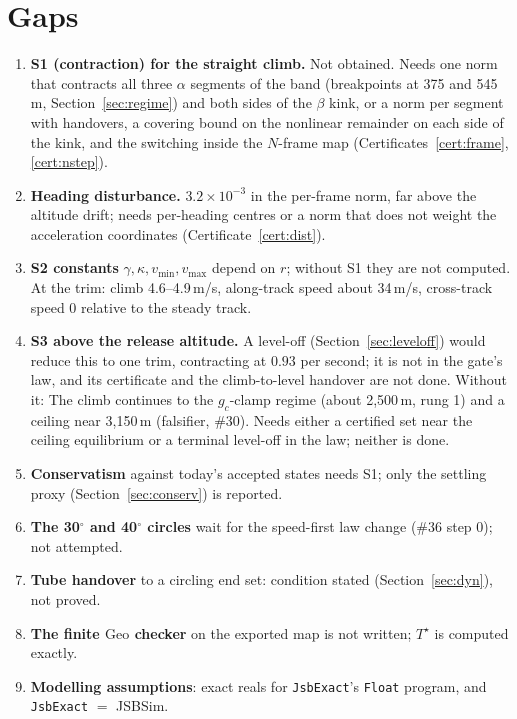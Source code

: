 \documentclass[11pt]{article}
\newcommand{\Geo}{\ensuremath{\mathrm{Geo}}}
\begin{document}
\section{Gaps}\label{sec:gaps}

\begin{enumerate}
\item[G1] \textbf{S1 (contraction) for the straight climb.} Not obtained. Needs one norm that contracts all three $\alpha$ segments of the band (breakpoints at 375 and 545\,m, Section~\ref{sec:regime}) and both sides of the $\beta$ kink, or a norm per segment with handovers, a covering bound on the nonlinear remainder on each side of the kink, and the switching inside the $N$-frame map (Certificates~\ref{cert:frame}, \ref{cert:nstep}).
\item[G2] \textbf{Heading disturbance.} $3.2\times10^{-3}$ in the per-frame norm, far above the altitude drift; needs per-heading centres or a norm that does not weight the acceleration coordinates (Certificate~\ref{cert:dist}).
\item[G3] \textbf{S2 constants} $\gamma, \kappa, v_{\min}, v_{\max}$ depend on $r$; without S1 they are not computed. At the trim: climb 4.6--4.9\,m/s, along-track speed about 34\,m/s, cross-track speed 0 relative to the steady track.
\item[G4] \textbf{S3 above the release altitude.} A level-off (Section~\ref{sec:leveloff}) would reduce this to one trim, contracting at $0.93$ per second; it is not in the gate's law, and its certificate and the climb-to-level handover are not done. Without it: The climb continues to the $g_c$-clamp regime (about 2{,}500\,m, rung 1) and a ceiling near 3{,}150\,m (falsifier, \#30). Needs either a certified set near the ceiling equilibrium or a terminal level-off in the law; neither is done.
\item[G5] \textbf{Conservatism} against today's accepted states needs S1; only the settling proxy (Section~\ref{sec:conserv}) is reported.
\item[G6] \textbf{The 30$^\circ$ and 40$^\circ$ circles} wait for the speed-first law change (\#36 step 0); not attempted.
\item[G7] \textbf{Tube handover} to a circling end set: condition stated (Section~\ref{sec:dyn}), not proved.
\item[G8] \textbf{The finite $\Geo$ checker} on the exported map is not written; $T^\star$ is computed exactly.
\item[G9] \textbf{Modelling assumptions}: exact reals for \texttt{JsbExact}'s \texttt{Float} program, and \texttt{JsbExact} $=$ JSBSim.

\end{enumerate}
\end{document}
